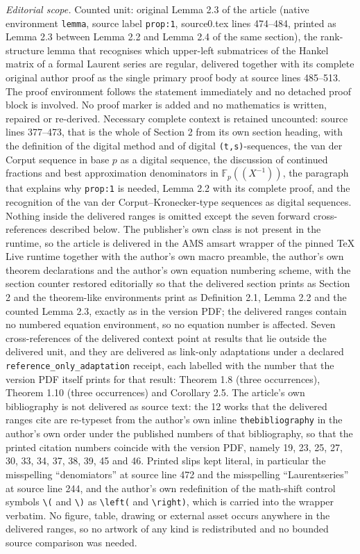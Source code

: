 \documentclass[10pt,a4paper]{amsart}
\newcommand{\FF}{\mathbb{F}}
\renewcommand{\(}{\left (}
\renewcommand{\)}{\right )}
\theoremstyle{definition}
\numberwithin{equation}{section}
\begin{document}
\noindent\textit{Editorial scope.} Counted unit: original Lemma 2.3 of the article (native environment \texttt{lemma}, source label \texttt{prop:1}, source0.tex lines 474--484, printed as Lemma 2.3 between Lemma 2.2 and Lemma 2.4 of the same section), the rank-structure lemma that recognises which upper-left submatrices of the Hankel matrix of a formal Laurent series are regular, delivered together with its complete original author proof as the single primary proof body at source lines 485--513. The proof environment follows the statement immediately and no detached proof block is involved. No proof marker is added and no mathematics is written, repaired or re-derived. Necessary complete context is retained uncounted: source lines 377--473, that is the whole of Section 2 from its own section heading, with the definition of the digital method and of digital \texttt{(t,s)}-sequences, the van der Corput sequence in base $p$ as a digital sequence, the discussion of continued fractions and best approximation denominators in $\FF_p((X^{-1}))$, the paragraph that explains why \texttt{prop:1} is needed, Lemma 2.2 with its complete proof, and the recognition of the van der Corput--Kronecker-type sequences as digital sequences. Nothing inside the delivered ranges is omitted except the seven forward cross-references described below. The publisher's own class is not present in the runtime, so the article is delivered in the AMS amsart wrapper of the pinned TeX Live runtime together with the author's own macro preamble, the author's own theorem declarations and the author's own equation numbering scheme, with the section counter restored editorially so that the delivered section prints as Section 2 and the theorem-like environments print as Definition 2.1, Lemma 2.2 and the counted Lemma 2.3, exactly as in the version PDF; the delivered ranges contain no numbered equation environment, so no equation number is affected. Seven cross-references of the delivered context point at results that lie outside the delivered unit, and they are delivered as link-only adaptations under a declared \texttt{reference\_only\_adaptation} receipt, each labelled with the number that the version PDF itself prints for that result: Theorem 1.8 (three occurrences), Theorem 1.10 (three occurrences) and Corollary 2.5. The article's own bibliography is not delivered as source text: the 12 works that the delivered ranges cite are re-typeset from the author's own inline \texttt{thebibliography} in the author's own order under the published numbers of that bibliography, so that the printed citation numbers coincide with the version PDF, namely 19, 23, 25, 27, 30, 33, 34, 37, 38, 39, 45 and 46. Printed slips kept literal, in particular the misspelling ``denomiators'' at source line 472 and the misspelling ``Laurentseries'' at source line 244, and the author's own redefinition of the math-shift control symbols \texttt{\textbackslash (} and \texttt{\textbackslash )} as \texttt{\textbackslash left(} and \texttt{\textbackslash right)}, which is carried into the wrapper verbatim. No figure, table, drawing or external asset occurs anywhere in the delivered ranges, so no artwork of any kind is redistributed and no bounded source comparison was needed.
\end{document}
